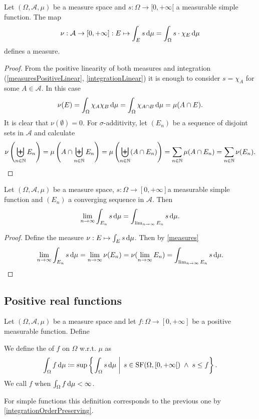 \begin{proposition}
Let $(\Omega, \mathcal{A}, \mu)$ be a measure space and $s:\Omega\to [0,+\infty[$ a measurable simple function. The map
\[ \nu:\mathcal{A}\to [0,+\infty]: E\mapsto \int_E s\operatorname{d \!}{\mu} = \int_\Omega s\cdot \chi_E\operatorname{d \!}{\mu} \]
defines a measure.
\end{proposition}
\begin{proof}
From the positive linearity of both measures and integration (\ref{measuresPositiveLinear}, \ref{integrationLinear}) it is enough to consider $s = \chi_A$ for some $A\in\mathcal{A}$. In this case
\[ \nu(E) = \int_\Omega\chi_A\chi_B \operatorname{d \!}{\mu} = \int_\Omega\chi_{A\cap B} \operatorname{d \!}{\mu} = \mu(A\cap E). \]
It is clear that $\nu(\emptyset) = 0$. For $\sigma$-additivity, let $(E_n)$ be a sequence of disjoint sets in $\mathcal{A}$ and calculate
\[ \nu\left(\biguplus_{n\in\mathbb{N}}E_n\right) = \mu\left(A\cap \biguplus_{n\in\mathbb{N}}E_n\right) = \mu\left(\biguplus_{n\in\mathbb{N}}(A\cap E_n)\right) = \sum_{n\in\mathbb{N}}\mu(A\cap E_n) = \sum_{n\in\mathbb{N}}\nu(E_n). \]
\end{proof}
\begin{corollary} \label{integralContinuousInDomain}
Let $(\Omega, \mathcal{A}, \mu)$ be a measure space, $s:\Omega\to[0,+\infty]$a measurable simple function and $(E_n)$ a converging sequence in $\mathcal{A}$. Then
\[ \lim_{n\to\infty}\int_{E_n}s\operatorname{d \!}{\mu} = \int_{\lim_{n\to\infty} E_n}s\operatorname{d \!}{\mu}. \]
\end{corollary}
\begin{proof}
Define the measure $\nu: E\mapsto \int_E s\operatorname{d \!}{\mu}$. Then by \ref{measures}
\[ \lim_{n\to\infty}\int_{E_n}s\operatorname{d \!}{\mu} = \lim_{n\to\infty}\nu(E_n) = \nu(\lim_{n\to\infty}E_n) =\int_{\lim_{n\to\infty}E_n}s\operatorname{d \!}{\mu}. \]
\end{proof}

\subsection{Positive real functions}
\begin{definition}
Let $(\Omega, \mathcal{A}, \mu)$ be a measure space and let $f:\Omega\to[0,+\infty]$ be a positive measurable function. Define

We define the  of $f$ on $\Omega$ w.r.t. $\mu$ as
\[ \int_\Omega f \operatorname{d \!}{\mu} \coloneqq \sup\left\{\left. \int_\Omega s \operatorname{d \!}{\mu} \;\right|\; s\in\operatorname{SF}(\Omega, [0,+\infty[)\;\land\; s\leq f \right\}. \]
We call $f$  when $\int_\Omega f \operatorname{d \!}{\mu} < \infty$.
\end{definition}
For simple functions this definition corresponds to the previous one by \ref{integrationOrderPreserving}.

